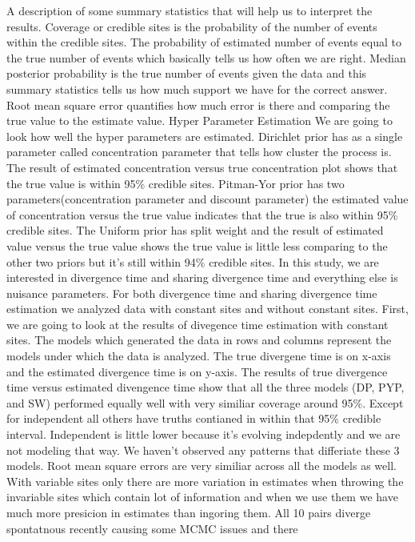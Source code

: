 \documentclass[letterpaper,12pt]{article}
\begin{document}
A description of some summary statistics that will help us to interpret the results. Coverage or credible sites is the probability
of the number of events within the credible sites. The probability of estimated number 
of events equal to the true number of events which basically tells us how often we 
are right. Median posterior probability is the true number of events given the data 
and this summary statistics tells us how much support we have for the correct answer.
Root mean square error quantifies how much error is there and comparing the true 
value to the estimate value. 
Hyper Parameter Estimation 
We are going to look how well the hyper parameters are estimated. Dirichlet
prior has as a single parameter called concentration parameter that tells how cluster 
the process is. The result of estimated concentration versus true concentration plot
shows that the true value is within 95\% credible sites. Pitman-Yor prior has two 
parameters(concentration parameter and discount parameter) the estimated value of 
concentration versus the true value indicates that the true is also within 95\%
credible sites. The Uniform prior has split weight and the result of estimated value 
versus the true value shows the true value is little less comparing to the other two 
priors but it's still within 94\% credible sites.
In this study, we are interested in divergence time and sharing divergence time and 
everything else is nuisance parameters. For both divergence time and sharing divergence time 
estimation we analyzed data with constant sites and without constant sites. First, we are going 
to look at the results of divegence time estimation with constant sites. The models which generated 
the data in rows and columns represent the models under which the data is analyzed. The true divergene 
time is on x-axis and the estimated divergence time is on y-axis. The results of true divergence 
time versus estimated divengence time show that all the three models (DP, PYP, and SW) performed
equally well with very similiar coverage around 95\%. Except for independent all others have truths 
contianed in within that 95\% credible interval. Independent is little lower because it's evolving 
indepdently and we are not modeling that way. We haven't observed any patterns that differiate
these 3 models. Root mean square errors are very similiar across all the models as well. 
With variable sites only there are more variation in estimates when throwing the invariable 
sites which contain lot of information and when we use them we have much more presicion in estimates
than ingoring them. All 10 pairs diverge spontatnous recently causing some MCMC issues and there 
\end{document}
